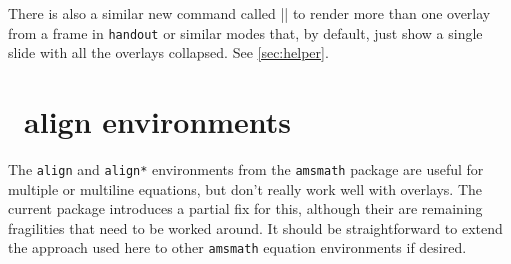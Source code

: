 \documentclass[a4paper]{ltxdoc}
\begin{document}
There is also a similar new command called |\handoutframe| to render more than
one overlay from a frame in \texttt{handout} or similar modes that, by default,
just show a single slide with all the overlays collapsed.  See \cref{sec:helper}.


\section{\AmSTeX\ align environments}

The \texttt{align} and \texttt{align*} environments from the \texttt{amsmath}
package are useful for multiple or multiline equations, but don't really work
well with overlays.  The current package introduces a partial fix for this,
although their are remaining fragilities that need to be worked around.  It
should be straightforward to extend the approach used here to other
\texttt{amsmath} equation environments if desired.
\end{document}
